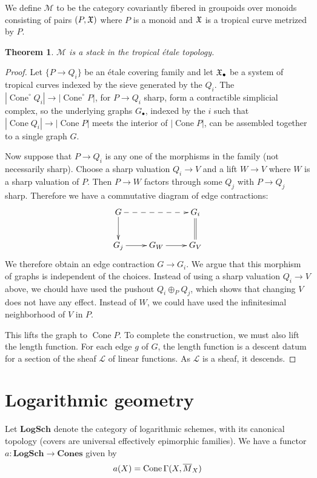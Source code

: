 \documentclass[12pt]{amsart}
\newtheorem{theorem}{Theorem}
\theoremstyle{definition}
\theoremstyle{remark}
\def\Cone{\operatorname{Cone}}
\def\Cones{\mathbf{Cones}}
\def\LogSch{\mathbf{LogSch}}
\def\overnorm#1{\overline{#1}\vphantom{#1}}
\begin{document}
We define $\mathscr M$ to be the category covariantly fibered in groupoids over monoids consisting of pairs $(P, \frak X)$ where $P$ is a monoid and $\frak X$ is a tropical curve metrized by $P$.  

\begin{theorem}
$\mathscr M$ is a stack in the tropical \'etale topology.
\end{theorem}
\begin{proof}
Let $\{ P \to Q_i \}$ be an \'etale covering family and let $\frak X_\bullet$ be a system of tropical curves indexed by the sieve generated by the $Q_i$.  The $|\Cone^\circ Q_i| \to |\Cone^\circ P|$, for $P \to Q_i$ sharp, form a contractible simplicial complex, so the underlying graphs $G_\bullet$, indexed by the $i$ such that $|\Cone Q_i| \to |\Cone P|$ meets the interior of $|\Cone P|$, can be assembled together to a single graph $G$.

Now suppose that $P \to Q_i$ is any one of the morphisms in the family (not necessarily sharp).  Choose a sharp valuation $Q_i \to V$ and a lift $W \to V$ where $W$ is a sharp valuation of $P$.  Then $P \to W$ factors through some $Q_j$ with $P \to Q_j$ sharp.  Therefore we have a commutative diagram of edge contractions:
\begin{equation*} \xymatrix{
G \ar@{-->}[rr] \ar[d] & &  G_i \ar@{=}[d] \\
G_j \ar[r] & G_W \ar[r] & G_V
} \end{equation*}
We therefore obtain an edge contraction $G \to G_i$.  We argue that this morphism of graphs is independent of the choices.  Instead of using a sharp valuation $Q_i \to V$ above, we chould have used the pushout $Q_i \oplus_P Q_j$, which shows that changing $V$ does not have any effect.  Instead of $W$, we could have used the infinitesimal neighborhood of $V$ in $P$.

This lifts the graph to $\Cone P$.  To complete the construction, we must also lift the length function.  For each edge $g$ of $G$, the length function is a descent datum for a section of the sheaf $\mathscr L$ of linear functions.  As $\mathscr L$ is a sheaf, it descends.
\end{proof}

\section{Logarithmic geometry}

Let $\LogSch$ denote the category of logarithmic schemes, with its canonical topology (covers are universal effectively epimorphic families).  We have a functor $a : \LogSch \to \Cones$ given by
\begin{equation}
a(X) = \Cone \Gamma(X, \overnorm M_X)
\end{equation}
\end{document}
